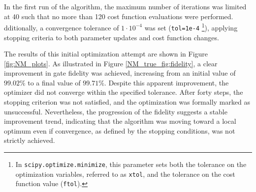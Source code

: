 In the first run of the algorithm, the maximum number of iterations was limited at 40 such that no more than 120 cost function evaluations were performed.
dditionally, a convergence tolerance of $1\cdot10^{-4}$ was set (\texttt{tol=1e-4} \footnote{In \texttt{scipy.optimize.minimize}, this parameter sets both the tolerance on the optimization variables, referred to as \texttt{xtol}, and the tolerance on the cost function value (\texttt{ftol}).}), applying stopping criteria to both parameter updates and cost function changes.

The results of this initial optimization attempt are shown in Figure \ref{fig:NM_plots}. As illustrated in Figure \ref{NM_true_fig:fidelity}, a clear improvement in gate fidelity was achieved, increasing from an initial value of $99.02\%$ to a final value of $99.71\%$.
Despite this apparent improvement, the optimizer did not converge within the specified tolerance. After forty steps, the stopping criterion was not satisfied, and the optimization was formally marked as unsuccessful. 
Nevertheless, the progression of the fidelity suggests a stable improvement trend, indicating that the algorithm was moving toward a local optimum even if convergence, as defined by the stopping conditions, was not strictly achieved.


